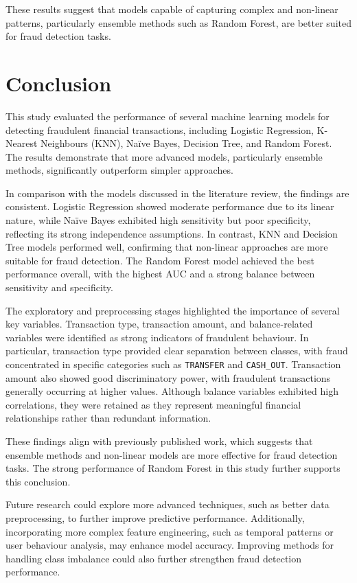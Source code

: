 \documentclass{article}
\begin{document}
These results suggest that models capable of capturing complex and non-linear patterns, particularly ensemble methods such as Random Forest, are better suited for fraud detection tasks.

\section{Conclusion}

This study evaluated the performance of several machine learning models for detecting fraudulent financial transactions, including Logistic Regression, K-Nearest Neighbours (KNN), Naïve Bayes, Decision Tree, and Random Forest. The results demonstrate that more advanced models, particularly ensemble methods, significantly outperform simpler approaches.

In comparison with the models discussed in the literature review, the findings are consistent. Logistic Regression showed moderate performance due to its linear nature, while Naïve Bayes exhibited high sensitivity but poor specificity, reflecting its strong independence assumptions. In contrast, KNN and Decision Tree models performed well, confirming that non-linear approaches are more suitable for fraud detection. The Random Forest model achieved the best performance overall, with the highest AUC and a strong balance between sensitivity and specificity.

The exploratory and preprocessing stages highlighted the importance of several key variables. Transaction type, transaction amount, and balance-related variables were identified as strong indicators of fraudulent behaviour. In particular, transaction type provided clear separation between classes, with fraud concentrated in specific categories such as \texttt{TRANSFER} and \texttt{CASH\_OUT}. Transaction amount also showed good discriminatory power, with fraudulent transactions generally occurring at higher values. Although balance variables exhibited high correlations, they were retained as they represent meaningful financial relationships rather than redundant information.

These findings align with previously published work, which suggests that ensemble methods and non-linear models are more effective for fraud detection tasks. The strong performance of Random Forest in this study further supports this conclusion.

Future research could explore more advanced techniques, such as better data preprocessing, to further improve predictive performance. Additionally, incorporating more complex feature engineering, such as temporal patterns or user behaviour analysis, may enhance model accuracy. Improving methods for handling class imbalance could also further strengthen fraud detection performance.
\end{document}
